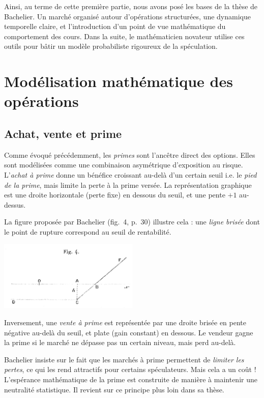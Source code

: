\documentclass[12pt,a4paper]{article}
\begin{document}
\bigskip

\noindent
Ainsi, au terme de cette première partie, nous avons  posé les bases de la thèse de Bachelier. Un marché organisé autour d’opérations structurées, une dynamique temporelle claire, et l’introduction d'un point de vue mathématique du comportement des cours. Dans la suite, le mathématicien novateur utilise ces outils pour bâtir un modèle probabiliste rigoureux de la spéculation.

\section{Modélisation mathématique des opérations}

\subsection{Achat, vente et prime}

Comme évoqué précédemment, les \textit{primes} sont l’ancêtre direct des options. Elles sont modélisées comme une combinaison asymétrique d’exposition au risque. L’\textit{achat à prime} donne un bénéfice croissant au-delà d’un certain seuil i.e. le \textit{pied de la prime}, mais limite la perte à la prime versée. La représentation graphique est une droite horizontale (perte fixe) en dessous du seuil, et une pente $+1$ au-dessus.

La figure proposée par Bachelier (fig.~4, p.~30) illustre cela : une \textit{ligne brisée} dont le point de rupture correspond au seuil de rentabilité.

\begin{center}
    \includegraphics[width=0.5\textwidth]{fig4.png}
\end{center}

Inversement, une \textit{vente à prime} est représentée par une droite brisée en pente négative au-delà du seuil, et plate (gain constant) en dessous. Le vendeur gagne la prime si le marché ne dépasse pas un certain niveau, mais perd au-delà.

Bachelier insiste sur le fait que les marchés à prime permettent de \textit{limiter les pertes}, ce qui les rend attractifs pour certains spéculateurs. Mais cela a un coût ! L'espérance mathématique de la prime est construite de manière à maintenir une neutralité statistique. Il revient sur ce principe plus loin dans sa thèse.
\end{document}
